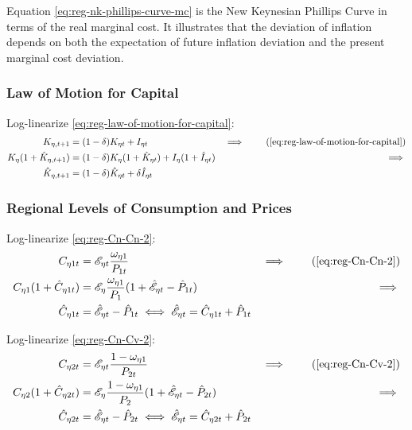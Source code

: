 \documentclass[../thesis.tex]{subfiles}
\begin{document}
Equation \ref{eq:reg-nk-phillips-curve-mc} is the New Keynesian Phillips Curve in terms of the real marginal cost. It illustrates that the deviation of inflation depends on both the expectation of future inflation deviation and the present marginal cost deviation.


\subsubsection*{Law of Motion for Capital}

Log-linearize \ref{eq:reg-law-of-motion-for-capital}:
	\begin{alignat}{2}
		K_{\eta, t+1} &= (1-\delta)K_{\eta t} + I_{\eta t} &\implies \tag{\ref{eq:reg-law-of-motion-for-capital}} \\
		K_{\eta} (1 + \hat{K}_{\eta, t+1}) &= (1-\delta) K_{\eta} (1 + \hat{K}_{\eta t}) + I_{\eta} (1 + \hat{I}_{\eta t}) &\implies \nonumber \\
		\hat{K}_{\eta, t+1} &= (1-\delta) \hat{K}_{\eta t} + \delta \hat{I}_{\eta t} \label{eq:reg-ll-law-of-motion-for-capital}
	\end{alignat}


\subsubsection*{Regional Levels of Consumption and Prices}

Log-linearize \ref{eq:reg-Cn-Cn-2}:
\begin{alignat}{2}
	C_{\eta 1 t} &= \te \frac{\omega_{\eta 1}}{P_{1 t}} &\implies \tag{\ref{eq:reg-Cn-Cn-2}} \\
	C_{\eta 1} (1 + \hat{C}_{\eta 1 t}) &= \mathscr{E}_{\eta} \frac{\omega_{\eta 1}}{P_{1}} (1 + \hat{\mathscr{E}}_{\eta t} - \hat{P}_{1 t}) &\implies \nonumber \\
	\hat{C}_{\eta 1 t} &= \hat{\mathscr{E}}_{\eta t} - \hat{P}_{1 t} \iff \hat{\mathscr{E}}_{\eta t} = \hat{C}_{\eta 1 t} + \hat{P}_{1 t} \label{eq:reg-ll-Cn-Cn-2}
\end{alignat}


Log-linearize \ref{eq:reg-Cn-Cv-2}:
\begin{alignat}{2}
	C_{\eta 2 t} &= \te \frac{1 - \omega_{\eta 1}}{P_{2 t}} &\implies \tag{\ref{eq:reg-Cn-Cv-2}} \\
	C_{\eta 2} (1 + \hat{C}_{\eta 2 t}) &= \mathscr{E}_{\eta} \frac{1 - \omega_{\eta 1}}{P_{2}} (1 + \hat{\mathscr{E}}_{\eta t} - \hat{P}_{2 t}) &\implies \nonumber \\
	\hat{C}_{\eta 2 t} &= \hat{\mathscr{E}}_{\eta t} - \hat{P}_{2 t} \iff \hat{\mathscr{E}}_{\eta t} = \hat{C}_{\eta 2 t} + \hat{P}_{2 t} \label{eq:reg-ll-Cn-Cv-2}
\end{alignat}
\end{document}
